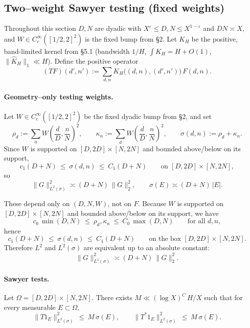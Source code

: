 \subsection*{Two–weight Sawyer testing (fixed weights)}

Throughout this section $D,N$ are dyadic with $X^\varepsilon\le D,N\le X^{1-\varepsilon}$ and $DN\asymp X$, and $W\in C_c^\infty([1/2,2]^2)$ is the fixed bump from §2. Let $K_H$ be the positive, band-limited kernel from §5.1 (bandwidth $1/H$, $\int K_H=H+O(1)$, $\| \widehat K_H\|_1\ll H$). Define the positive operator
\[
(TF)(d',n') := \sum_{d,n} K_H\!\big((d,n),(d',n')\big)\,F(d,n).
\]

\paragraph{Geometry–only testing weights.}
Let $W\in C_c^\infty([1/2,2]^2)$ be the fixed dyadic bump from §2, and set
\[
\rho_d := \sum_{n} W\!\left(\frac dD,\frac nN\right)^2,\qquad 
\kappa_n := \sum_{d} W\!\left(\frac dD,\frac nN\right)^2,\qquad 
\sigma(d,n):=\rho_d+\kappa_n .
\]
Since $W$ is supported on $[D,2D]\times[N,2N]$ and bounded above/below on its support,
\[
c_1(D+N)\ \le\ \sigma(d,n)\ \le\ C_1(D+N)\qquad\text{on }[D,2D]\times[N,2N],
\]
so
\begin{equation}\label{eq:L2-sigma-equiv}
\|G\|_{L^2(\sigma)}^2\asymp (D+N)\,\|G\|_{2}^2,\qquad \sigma(E)\asymp (D+N)\,|E|.
\end{equation}

These depend only on $(D,N,W)$, not on $F$. Because $W$ is supported on $[D,2D]\times[N,2N]$ and bounded above/below on its support, we have
\[
c_0\,\min(D,N)\ \le\ \rho_d,\kappa_n\ \le\ C_0\,\max(D,N)\qquad\text{for all }d,n,
\]
hence
\[
c_1(D+N)\ \le\ \sigma(d,n)\ \le\ C_1(D+N)\qquad\text{on the box }[D,2D]\times[N,2N].
\]
Therefore $L^2$ and $L^2(\sigma)$ are equivalent up to an absolute constant:
\[
\|G\|_{L^2(\sigma)}^2 \asymp (D+N)\,\|G\|_2^2.
\]

\paragraph{Sawyer tests.}
Let $\Omega=[D,2D]\times[N,2N]$. There exists $M\ll (\log X)^C\,H/X$ such that for every measurable $E\subset\Omega$,
\begin{equation}\label{eq:sawyer-tests}
\|T 1_E\|_{L^2(\sigma)}^2 \ \le\ M\,\sigma(E), 
\qquad 
\|T^\ast 1_E\|_{L^2(\sigma)}^2 \ \le\ M\,\sigma(E).
\end{equation}

